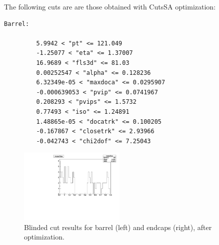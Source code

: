 The following cuts are are those obtained with CutsSA optimization:

\begin{verbatim}
Barrel:

 		 5.9942 < "pt" <= 121.049
 		 -1.25077 < "eta" <= 1.37007
 		 16.9689 < "fls3d" <= 81.03
 		 0.00252547 < "alpha" <= 0.128236
 		 6.32349e-05 < "maxdoca" <= 0.0295907
 		 -0.000639053 < "pvip" <= 0.0741967
 		 0.208293 < "pvips" <= 1.5732
 		 0.77493 < "iso" <= 1.24891
 		 1.48865e-05 < "docatrk" <= 0.100205
 		 -0.167867 < "closetrk" <= 2.93966
 		 -0.042743 < "chi2dof" <= 7.25043
\end{verbatim}

\begin{figure}[!h]
  \centering
  \includegraphics[width=0.45\textwidth]{Figures/cnt/SA_barrel_mass_opt}
\caption{Blinded cut results for barrel (left) and endcaps (right), after optimization.}
\end{figure}




%
